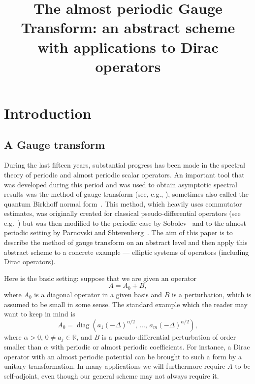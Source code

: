 \documentclass[AHL,Unicode,longabstracts,published]{cedram}
\title[Gauge transform and applications]{The almost periodic Gauge Transform: an abstract scheme with applications to Dirac operators}
\author[\initial{J.} \lastname{Lagacé}]{\firstname{Jean} \lastname{Lagacé}}
\author[\initial{S.} \lastname{Morozov}]{\firstname{Sergey} \lastname{Morozov}}
\author[\initial{L.} \lastname{Parnovski}]{\firstname{Leonid}
\lastname{Parnovski}}
\author[\initial{B.} \lastname{Pfirsch}]{\firstname{Bernhard}
\lastname{Pfirsch}}
\author[\initial{R.} \lastname{Shterenberg}]{\firstname{Roman}
\lastname{Shterenberg}}
\DeclareMathOperator{\diag}{diag}
\newcommand{\R}{\mathbb R}
\begin{document}
\maketitle
\tableofcontents


\section{Introduction}



\subsection{A Gauge transform}

During the last fifteen years, substantial progress has been made in the spectral theory of periodic and almost periodic scalar operators. An important tool that was developed during this period and was used to obtain asymptotic spectral results was the method of gauge transform (see, e.g., \cite{Ivrii2018,MorParSht2014,ParSob2010,
ParSht2012,
ParSht2016,ParSht2019,Sobolev2005,Sobolev2006}), sometimes also called the quantum Birkhoff normal form~\cite{LaurentVuNgoc}. This method, which heavily uses commutator estimates, was originally created for classical pseudo-differential operators (see e.g.~\cite{Rozenbljum1978,Weinstein1977}) but was then modified to the periodic case by Sobolev~\cite{Sobolev2005,Sobolev2006} and to the almost periodic setting by Parnovski and Shterenberg~\cite{ParSht2012}. The aim of this paper is to describe the method of gauge transform on an abstract level and then apply this abstract scheme to a concrete example --- elliptic systems of operators (including Dirac operators).

Here is the basic setting: suppose that we are given an operator
\begin{equation}\label{LP1}
A = A_0 + B,
\end{equation}
where $A_0$ is a diagonal operator in a given basis and $B$ is a perturbation, which is assumed to be small in some sense. The standard example which the reader may want to keep in mind is
\begin{equation}
A_0 = \diag\left(a_1(-\Delta)^{\alpha/2},\,\dotsc,\,a_m(-\Delta)^{\alpha/2}\right),
\end{equation}
where $\alpha>0$, $0 \ne a_j \in \R$, and $B$ is a pseudo-differential perturbation of order smaller than $\alpha$ with periodic or almost periodic coefficients. For instance, a Dirac operator with an almost periodic potential can be brought to such a form by a unitary transformation. In many applications we will furthermore require $A$ to be self-adjoint, even though our general scheme may not always require it.
\end{document}
